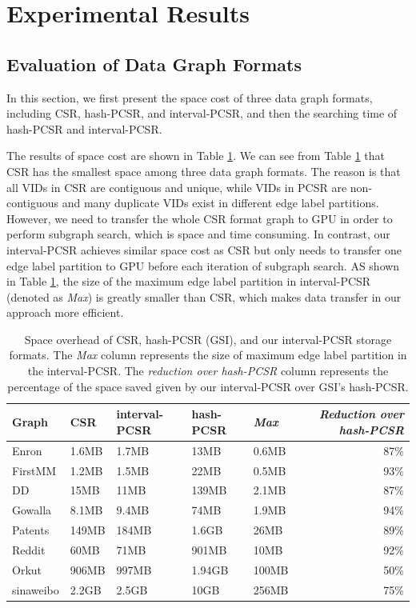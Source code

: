 \section{Experimental Results}


\subsection{Evaluation of Data Graph Formats}
In this section, we first present the space cost of three data graph formats, including CSR, hash-PCSR, and  interval-PCSR, and then the searching time of hash-PCSR and interval-PCSR.

The results of space cost are shown in Table \ref{tab:graphsize}. We can see from Table \ref{tab:graphsize} that CSR has the smallest space among three data graph formats. The reason is that all VIDs in CSR are contiguous and unique, while VIDs in PCSR are non-contiguous and many duplicate VIDs exist in different edge label partitions. However, we need to transfer the whole CSR format graph to GPU in order to perform subgraph search, which is space and time consuming. In contrast, our interval-PCSR achieves similar space cost as CSR but only needs to transfer one edge label partition to GPU before each iteration of subgraph search. AS shown in Table \ref{tab:graphsize}, the size of the maximum edge label partition in interval-PCSR (denoted as \emph{Max}) is greatly smaller than CSR, which makes data transfer in our approach more efficient.


\begin{table}
\centering
  \caption{Space overhead of CSR, hash-PCSR (GSI), and our interval-PCSR storage formats. The \emph{Max} column represents the size of maximum edge label partition in
  the interval-PCSR. The \emph{reduction over hash-PCSR} column represents the percentage of the space saved given by our interval-PCSR over GSI's hash-PCSR.}
  \label{tab:graphsize}
  \scriptsize
  \begin{tabular}{lllllr}
  \toprule
    \textbf{Graph} &\textbf{CSR}&\textbf{interval-PCSR}&\textbf{hash-PCSR}&\emph{\textbf{Max}}&\emph{Reduction over hash-PCSR}\\
    \midrule
    Enron 		&1.6MB	&1.7MB	&13MB	&0.6MB	&87\% \\
    FirstMM 	&1.2MB	&1.5MB	&22MB	&0.5MB	&93\% \\
    DD 			&15MB	&11MB	&139MB	&2.1MB	&87\% \\
    Gowalla 	&8.1MB	&9.4MB	&74MB	&1.9MB	&94\% \\
    Patents 	&149MB	&184MB	&1.6GB	&26MB	&89\% \\
    Reddit 		&60MB	&71MB	&901MB	&10MB	&92\% \\
    Orkut 		&906MB	&997MB	&1.94GB	&100MB	&50\% \\
    sinaweibo	&2.2GB	&2.5GB	&10GB	&256MB	&75\% \\

    \bottomrule
  \end{tabular}
\end{table}

